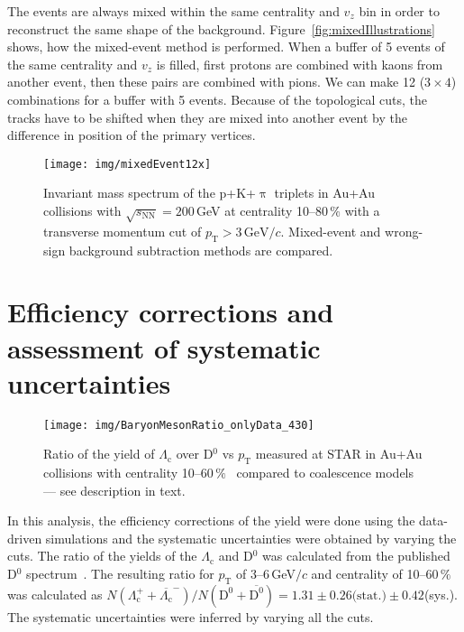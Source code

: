 The events are always mixed within the same centrality and $v_z$ bin in order to reconstruct the same shape of the background. Figure~\ref{fig:mixedIllustrations} shows, how the mixed-event method is performed. When a buffer of 5 events of the same centrality and $v_z$ is filled, first protons are combined with kaons from another event, then these pairs are combined with pions. We can make 12 ($3 \times 4$) combinations for a buffer with 5 events. Because of the topological cuts, the tracks have to be shifted when they are mixed into another event by the difference in position of the primary vertices.

\begin{figure}[htb]
\centering
\texttt{[image: img/mixedEvent12x]}
\caption{Invariant mass spectrum of the p+K+$\uppi$ triplets in Au+Au collisions with $\sqrt{s_\mathrm{NN}} = 200\,$GeV at centrality 10--80$\,\%$ with a transverse momentum cut of $p_\mathrm{T} > 3\,\text{GeV}/c$. Mixed-event and wrong-sign background subtraction methods are compared.}
\label{fig:invMass}
\end{figure}

\section{Efficiency corrections and assessment of systematic uncertainties}

\begin{figure}[htb]
\centering %
\texttt{[image: img/BaryonMesonRatio\_onlyData\_430]}
\caption{Ratio of the yield of $\Lambda_\mathrm{c}$ over D$^0$ vs $p_\mathrm{T}$ measured at STAR in Au+Au collisions with centrality 10--60$\,\%$~\cite{GuannanLc} compared to coalescence models~\cite{LcCoalescence_OhKoLeeYasui, Ghosh_Lc_rescattering, SHM} --- see description in text.}
\label{fig:ratio}
\end{figure}

In this analysis, the efficiency corrections of the yield were done using the data-driven simulations and the systematic uncertainties were obtained by varying the cuts. The ratio of the yields of the $\Lambda_\mathrm{c}$ and D$^0$ was calculated from the published D$^0$ spectrum~\cite{publishedDzero}. The resulting ratio for $p_\mathrm{T}$ of 3--6$\,$GeV$/c$ and centrality of 10--60$\,\%$ was calculated as $N(\Lambda_\mathrm{c}^+ + \overline{\Lambda_\mathrm{c}}^-)/N(\mathrm{D^0 + \overline{D^0}}) = 1.31 \pm 0.26\text{(stat.)} \pm 0.42$(sys.). The systematic uncertainties were inferred by varying all the cuts.


